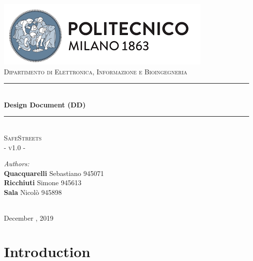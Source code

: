 \documentclass{article}
\begin{document}
	\begin{titlepage}
		
		\centering
		\vspace*{0.7 cm}
		\includegraphics[scale = 0.7]{images/PolimiLogo.png}\\[1 cm]
		\textsc{\large Dipartimento di Elettronica, Informazione e Bioingegneria}\\[2 cm]
		
		\rule{\linewidth}{0.2 mm} \\[0.5 cm]
		{\huge \bfseries Design Document (DD)}\\
		\rule{\linewidth}{0.2 mm} \\[1.5 cm]
		
		\textsc{\Large SafeStreets}\\[0.5 cm]
		\textsc{\large - v1.0 -}\\[1 cm]
		
		\begin{minipage}{\textwidth}
			\begin{flushleft} \large
				\emph{Authors:}\\
				\textbf{Quacquarelli} Sebastiano \hfill 945071 \\
				\textbf{Ricchiuti} Simone \hfill 945613  \\
				\textbf{Sala} Nicolò \hfill 945898  \\[2 cm]
			\end{flushleft}
		\end{minipage}\\[2 cm]
		
		{\large December  , 2019}\\[2 cm]
		
	\end{titlepage}
	
	\tableofcontents
	\clearpage
	\newpage
	\setcounter{page}{1}
	
	\section{Introduction}
\end{document}
